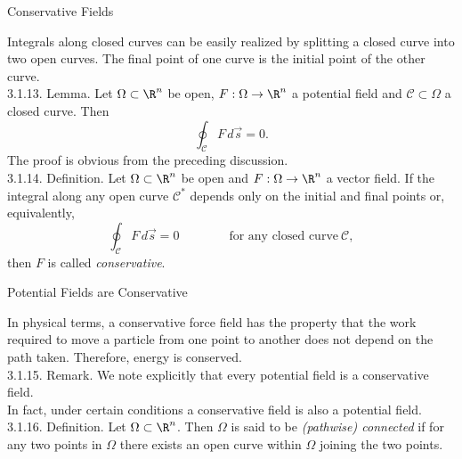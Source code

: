 \documentclass[smaller,hyperref={CJKbookmarks=true}]{beamer}
\begin{document}
\begin{frame}[t]{Conservative Fields}
\begin{spacing}{1}
Integrals along closed curves can be easily realized by splitting a closed
curve into two open curves. The final point of one curve is the initial point
of the other curve.\\[5pt]
\alert{3.1.13. Lemma.} Let $\Omega\subset\R^n$ be open, $F:\Omega\to\R^n$ a potential field and $\mathcal{C}\subset\Omega$ a closed curve. Then
\[\oint_{\mathcal{C}}F\,d\vec{s}=0.\]
The proof is obvious from the preceding discussion.\\[3pt]
\alert{3.1.14. Definition.} Let $\Omega\subset\R^n$ be open and $F:\Omega\to\R^n$ a vector field. If the integral along any open curve $\mathcal{C}^*$ depends only on the initial and final points or, equivalently,
\[\oint_{\mathcal{C}}F\,d\vec{s}=0\qquad
\qquad\text{for any closed curve}~\mathcal{C},\]
then $F$ is called \emph{conservative}.
\end{spacing}
\end{frame}
\begin{frame}[c]{Potential Fields are Conservative}
\begin{spacing}{1.1}
In physical terms, a conservative force field has the property that the work
required to move a particle from one point to another does not depend on
the path taken. Therefore, energy is conserved.\\[6pt]
\alert{3.1.15. Remark.} We note explicitly that every potential field is a
conservative field.\\[5pt]
In fact, under certain conditions a conservative field is also a potential
field.\\[4pt]
\alert{3.1.16. Definition.} Let $\Omega\subset\R^n$. Then $\Omega$ is said to be \emph{(pathwise) connected} if for any two points in $\Omega$ there exists an open curve within $\Omega$ joining the two points.
\end{spacing}
\end{frame}
\end{document}

